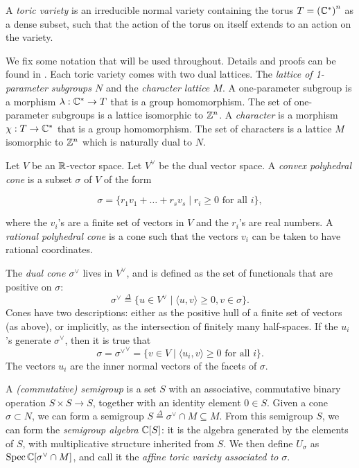 \begin{definition}
A \emph{toric variety} is an irreducible normal variety containing the torus ${T={(\mathbb{C}^\ast)}^n}$  as a dense subset, such that the action of the torus on itself extends to an action on the variety.
\end{definition}

We fix some notation that will be used throughout. Details and proofs can be found in \cite{cox_toric,fulton_toric}. Each toric variety comes with two dual lattices. The \emph{lattice of 1-parameter subgroups $N$} and the \emph{character lattice $M$}. A one-parameter subgroup is a morphism $\lambda:\mathbb{C} ^\ast \to T$ that is a group homomorphism. The set of one-parameter subgroups is a lattice isomorphic to $\mathbb{Z}^n$. A \emph{character} is a morphism $\chi:T \to \mathbb{C}^\ast$ that is a group homomorphism. The set of characters is a lattice $M$ isomorphic to $\mathbb{Z}^n$ which is naturally dual to $N$.

Let $V$ be an $\mathbb{R}$-vector space. Let $V^\vee$ be the dual vector space. A \emph{convex polyhedral cone} is a subset $\sigma$ of $V$ of the form

$$
\sigma = \{ r_1 v_1 + \dots + r_s v_s \mid r_i \geq 0 \text{ for all } i \},
$$

where the $v_i$'s are a finite set of vectors in $V$ and the $r_i$'s are real numbers. A \emph{rational polyhedral cone} is a cone such that the vectors $v_i$ can be taken to have rational coordinates.

The \emph{dual cone $\sigma^\vee$} lives in $V^\vee$, and is defined as the set of functionals that are positive on $\sigma$:
$$
\sigma^\vee \stackrel{\Delta}{=} \{ u \in V^\vee \mid \langle u,v\rangle \geq 0, v \in \sigma \}.
$$
Cones have two descriptions: either as the positive hull of a finite set of vectors (as above), or implicitly, as the intersection of finitely many half-spaces. If the $u_i$'s generate $\sigma^\vee$, then it is true that
$$
\sigma = {\sigma^\vee}^ \vee  = \{ v \in V \mid \langle u_i,v \rangle \geq 0 \text{ for all } i \}.
$$
The vectors $u_i$ are the inner normal vectors of the facets of $\sigma$.

A \emph{(commutative) semigroup} is a set $S$ with an associative, commutative binary operation $S \times S \to S$, together with an identity element $0 \in S$. Given a cone $\sigma \subset N$, we can form a semigroup $S\stackrel{\Delta}{=} \sigma^\vee \cap M \subseteq M$. From this semigroup $S$, we can form the \emph{semigroup algebra} $\mathbb{C}[S]$: it is the algebra generated by the elements of $S$, with multiplicative structure inherited from $S$. We then define $U_\sigma$ as $\operatorname{Spec} \mathbb{C}[\sigma^\vee \cap M]$, and call it the \emph{affine toric variety associated to $\sigma$}. 

